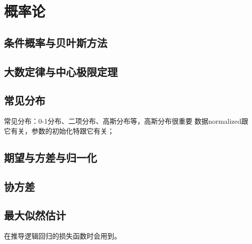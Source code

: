 \chapter{概率论}
    \section{条件概率与贝叶斯方法}
    \section{大数定律与中心极限定理}
    \section{常见分布}
    常见分布：0-1分布、二项分布、高斯分布等，高斯分布很重要
    数据normalized跟它有关，参数的初始化特跟它有关；
    \section{期望与方差与归一化}
    \section{协方差}
    \section{最大似然估计}
    在推导逻辑回归的损失函数时会用到。
